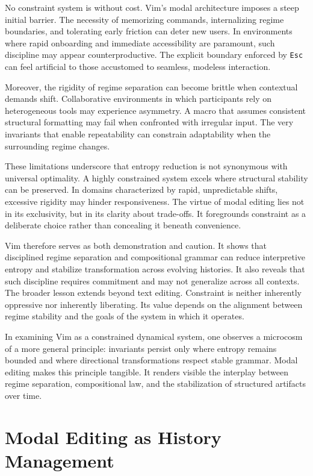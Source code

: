 \documentclass[12pt]{article}
\begin{document}
No constraint system is without cost. Vim’s modal architecture imposes a steep initial barrier. The necessity of memorizing commands, internalizing regime boundaries, and tolerating early friction can deter new users. In environments where rapid onboarding and immediate accessibility are paramount, such discipline may appear counterproductive. The explicit boundary enforced by \texttt{Esc} can feel artificial to those accustomed to seamless, modeless interaction.

Moreover, the rigidity of regime separation can become brittle when contextual demands shift. Collaborative environments in which participants rely on heterogeneous tools may experience asymmetry. A macro that assumes consistent structural formatting may fail when confronted with irregular input. The very invariants that enable repeatability can constrain adaptability when the surrounding regime changes.

These limitations underscore that entropy reduction is not synonymous with universal optimality. A highly constrained system excels where structural stability can be preserved. In domains characterized by rapid, unpredictable shifts, excessive rigidity may hinder responsiveness. The virtue of modal editing lies not in its exclusivity, but in its clarity about trade-offs. It foregrounds constraint as a deliberate choice rather than concealing it beneath convenience.

Vim therefore serves as both demonstration and caution. It shows that disciplined regime separation and compositional grammar can reduce interpretive entropy and stabilize transformation across evolving histories. It also reveals that such discipline requires commitment and may not generalize across all contexts. The broader lesson extends beyond text editing. Constraint is neither inherently oppressive nor inherently liberating. Its value depends on the alignment between regime stability and the goals of the system in which it operates.

In examining Vim as a constrained dynamical system, one observes a microcosm of a more general principle: invariants persist only where entropy remains bounded and where directional transformations respect stable grammar. Modal editing makes this principle tangible. It renders visible the interplay between regime separation, compositional law, and the stabilization of structured artifacts over time.

\section{Modal Editing as History Management}
\end{document}
